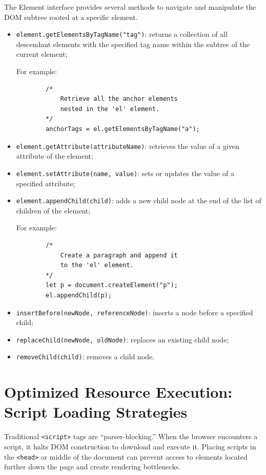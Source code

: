 \documentclass{scrbook}
\begin{document}
	The Element interface provides several methods to navigate and manipulate the DOM subtree rooted at a specific element.
	
	\begin{itemize}
		\item \texttt{element.getElementsByTagName("tag")}: returns a collection of all descendant elements with the specified tag name within the subtree of the current element;
		
		For example:
		
		\begin{lstlisting}
		/*
			Retrieve all the anchor elements
			nested in the 'el' element.
		*/
		anchorTags = el.getElementsByTagName("a");
		\end{lstlisting}
		
		\item \texttt{element.getAttribute(attributeName)}: retrieves the value of a given attribute of the element;
		
		\item \texttt{element.setAttribute(name, value)}: sets or updates the value of a specified attribute;
		
		\item \texttt{element.appendChild(child)}: adds a new child node at the end of the list of children of the element;
		
		For example:
		
		\begin{lstlisting}
		/*
			Create a paragraph and append it
			to the 'el' element.
		*/
		let p = document.createElement("p");
		el.appendChild(p);
		\end{lstlisting}
	
		\item \texttt{insertBefore(newNode, referenceNode)}: inserts a node before a specified child;
		
		\item \texttt{replaceChild(newNode, oldNode)}: replaces an existing child node;
		
		\item \texttt{removeChild(child)}: removes a child node.
	\end{itemize}
	
	\chapter{Optimized Resource Execution: Script Loading Strategies}
	
	Traditional \texttt{<script>} tags are ``parser-blocking.'' When the browser encounters a script, it halts DOM construction to download and execute it. Placing scripts in the \texttt{<head>} or middle of the document can prevent access to elements located further down the page and create rendering bottlenecks.\\
	
\end{document}
